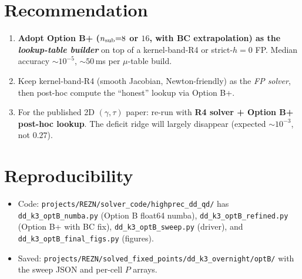 \documentclass[11pt]{article}
\begin{document}
\section{Recommendation}

\begin{enumerate}
  \item \textbf{Adopt Option B+ ($n_{\rm sub}{=}8$ or $16$, with BC
        extrapolation) as the \emph{lookup-table builder}} on top of a
        kernel-band-R4 or strict-$h{=}0$ FP. Median accuracy
        $\sim 10^{-5}$, $\sim 50$\,ms per $\mu$-table build.
  \item Keep kernel-band-R4 (smooth Jacobian, Newton-friendly) as the
        \emph{FP solver}, then post-hoc compute the ``honest'' lookup
        via Option B+.
  \item For the published 2D $(\gamma, \tau)$ paper: re-run with
        \textbf{R4 solver + Option B+ post-hoc lookup}. The deficit
        ridge will largely disappear (expected $\sim 10^{-3}$, not $0.27$).
\end{enumerate}

\section{Reproducibility}

\begin{itemize}
  \item Code: \texttt{projects/REZN/solver\_code/highprec\_dd\_qd/} has
        \texttt{dd\_k3\_optB\_numba.py} (Option B float64 numba),
        \texttt{dd\_k3\_optB\_refined.py} (Option B+ with BC fix),
        \texttt{dd\_k3\_optB\_sweep.py} (driver), and
        \texttt{dd\_k3\_optB\_final\_figs.py} (figures).
  \item Saved: \texttt{projects/REZN/solved\_fixed\_points/dd\_k3\_overnight/optB/}
        with the sweep JSON and per-cell $P$ arrays.
\end{itemize}
\end{document}
